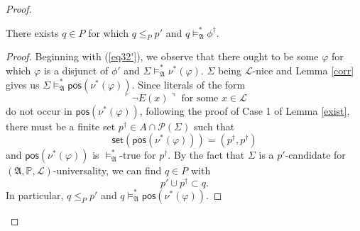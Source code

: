 \documentclass[12pt]{article}
\numberwithin{equation}{section}
\begin{document}
\begin{proof}
\begin{enumerate}[label=Case \arabic*:, leftmargin=50pt]
    \begin{claim2}\label{claim335}
    There exists $q \in P$ for which $q \leq_P p'$ and $q \models^{*}_{\mathfrak{A}} \phi^{\dagger}$.
    \end{claim2}

    \begin{proof}
    Beginning with (\ref{eq32'}), we observe that there ought to be some $\varphi$ for which $\varphi$ is a disjunct of $\phi'$ and $\Sigma \models^{*}_{\mathfrak{A}} \nu^*(\varphi)$. $\Sigma$ being $\mathcal{L}$-nice and Lemma \ref{corr} gives us $\Sigma \models^{*}_{\mathfrak{A}} \mathsf{pos}(\nu^*(\varphi))$. 
    Since literals of the form $$\ulcorner \neg E(x) \urcorner \text{ for some } x \in \mathcal{L}$$ do not occur in $\mathsf{pos}(\nu^*(\varphi))$, following the proof of Case 1 of Lemma \ref{exist}, there must be a finite set $p^{\dagger} \in A \cap \mathcal{P}(\Sigma)$ such that $$\mathsf{set}(\mathsf{pos}(\nu^*(\varphi))) = (p^{\dagger}, p^{\dagger})$$ and $\mathsf{pos}(\nu^*(\varphi))$ is $\models^{*}_{\mathfrak{A}}$-true for $p^{\dagger}$. By the fact that $\Sigma$ is a $p'$-candidate for $(\mathfrak{A}, \mathbb{P}, \mathcal{L})$-universality, we can find $q \in P$ with $$p' \cup p^{\dagger} \subset q.$$ In particular, $q \leq_P p'$ and $q \models^{*}_{\mathfrak{A}} \mathsf{pos}(\nu^*(\varphi))$.
    

\end{proof}
\end{enumerate}
\end{proof}
\end{document}
